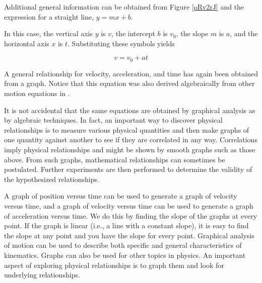 \documentclass[../../main-ap-physics.tex]{subfiles}
\begin{document}
\vspace{1em}

Additional general information can be obtained from Figure \ref{oRv2rJ} and the expression for a straight line, $y = mx + b$.

\vspace{1em}

In this case, the vertical axis $y$ is $v$, the intercept $b$ is $v_0$, the slope $m$ is $a$, and the horizontal axis $x$ is $t$. Substituting these symbols yields

\begin{equation}
    v = v_0 + at
\end{equation}

A general relationship for velocity, acceleration, and time has again been obtained from a graph. Notice that this equation was also derived algebraically from other motion equations in .

\vspace{1em}

It is not accidental that the same equations are obtained by graphical analysis as by algebraic techniques. In fact, an important way to discover physical relationships is to measure various physical quantities and then make graphs of one quantity against another to see if they are correlated in any way. Correlations imply physical relationships and might be shown by smooth graphs such as those above. From such graphs, mathematical relationships can sometimes be postulated. Further experiments are then performed to determine the validity of the hypothesized relationships.

\vspace{1em}



A graph of position versus time can be used to generate a graph of velocity versus time, and a graph of velocity versus time can be used to generate a graph of acceleration versus time. We do this by finding the slope of the graphs at every point. If the graph is linear (i.e., a line with a constant slope), it is easy to find the slope at any point and you have the slope for every point. Graphical analysis of motion can be used to describe both specific and general characteristics of kinematics. Graphs can also be used for other topics in physics. An important aspect of exploring physical relationships is to graph them and look for underlying relationships.
\end{document}
